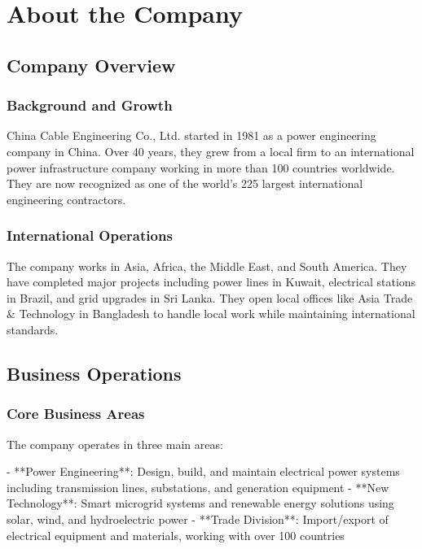 
\chapter{About the Company}

\section{Company Overview}

\subsection{Background and Growth}
China Cable Engineering Co., Ltd. started in 1981 as a power engineering company in China. Over 40 years, they grew from a local firm to an international power infrastructure company working in more than 100 countries worldwide. They are now recognized as one of the world's 225 largest international engineering contractors.

\subsection{International Operations}
The company works in Asia, Africa, the Middle East, and South America. They have completed major projects including power lines in Kuwait, electrical stations in Brazil, and grid upgrades in Sri Lanka. They open local offices like Asia Trade \& Technology in Bangladesh to handle local work while maintaining international standards.

\vspace{0.5em}

\section{Business Operations}

\subsection{Core Business Areas}
The company operates in three main areas:

- **Power Engineering**: Design, build, and maintain electrical power systems including transmission lines, substations, and generation equipment
- **New Technology**: Smart microgrid systems and renewable energy solutions using solar, wind, and hydroelectric power
- **Trade Division**: Import/export of electrical equipment and materials, working with over 100 countries

